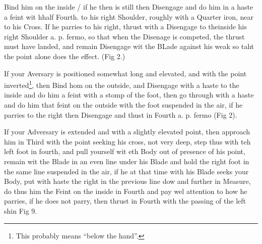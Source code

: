 \exercise{}
Bind him on the inside / if he then is still then Disengage and do him
in a haste a feint wit hhalf Fourth. to his right Shoulder, roughly
with a Quarter iron, near to his Cross. If he parries to his right,
thrust with a Disengage to theinside his right Shoulder a. p. fermo,
so that when the Disenage is competed, the thrust must have landed,
and remain Disengage wit the BLade against his weak so taht the point
alone does the effect. (Fig 2.)

If your Aversary is positioned somewhat long and elevated, and with
the point inverted\footnote{This probably means ``below the hand''.},
then Bind hom on the outside, and Disengage with a haste to the inside
and do him a feint with a stomp of the foot, then go through with a
haste and do him that feint on the outside with the foot suspended in
the air, if he parries to the right then Disengage and thust in Fourth
a. p. fermo (Fig 2).

\exercise{}
If your Adversary is extended and with a slightly elevated point, then
approach him in Third with the point seeking his cross, not very deep,
step thus with teh left foot in fourth, and pull yourself wit eth Body
out of presence of his point, remain wit the Blade in an even line
under his Blade and hold the right foot in the same line suspended in
the air, if he at that time with his Blade seeks your Body, put with
haste the right in the previous line dow and further in Measure, do
thus him the Feint on the inside in Fourth and pay wel attention to
how he parries, if he does not parry, then thrust in Fourth with the
passing of the left shin Fig 9.

